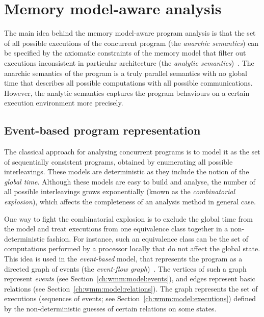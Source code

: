 \chapter{Memory model-aware analysis}
\label{ch:wmm}

The main idea behind the memory model-aware program analysis is that the set of all possible executions of the concurrent program (the \textit{anarchic semantics}) can be specified by the axiomatic constraints of the memory model that filter out executions inconsistent in particular architecture (the \textit{analytic semantics})~\cite{alglave2016syntax}.
The anarchic semantics of the program is a truly parallel semantics with no global time that describes all possible computations with all possible communications.
However, the analytic semantics captures the program behaviours on a certain execution environment more precisely.


\section{Event-based program representation}
\label{ch:wmm:model}

The classical approach for analysing concurrent programs is to model it as the set of sequentially consistent programs, obtained by enumerating all possible interleavings.
These models are deterministic as they include the notion of the \textit{global time}. %
Although these models are easy to build and analyse, the number of all possible interleavings grows exponentially (known as the \textit{combinatorial explosion}), which affects the completeness of an analysis method in general case.

One way to fight the combinatorial explosion is to exclude the global time from the model and treat executions from one equivalence class together in a non-deterministic fashion.
For instance, such an equivalence class can be the set of computations performed by a processor locally that do not affect the global state.
This idea is used in the \textit{event-based} model, that represents the program as a directed graph of events (the \textit{event-flow graph})~\cite{alglave2010shared,alglave2014herding}.
The vertices of such a graph represent \textit{events} (see Section~\ref{ch:wmm:model:events}), and edges represent basic relations (see Section~\ref{ch:wmm:model:relations}).
The graph represents the set of executions (sequences of events; see Section~\ref{ch:wmm:model:executions}) defined by the non-deterministic guesses of certain relations on some states.

